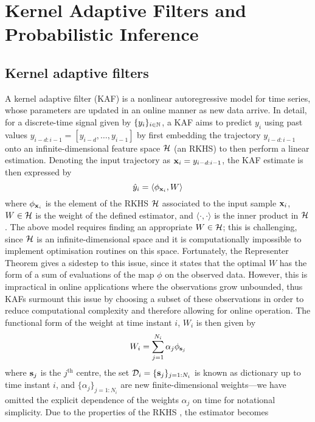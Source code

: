 
\section{Kernel Adaptive Filters and Probabilistic Inference}

\subsection{Kernel adaptive filters}

A kernel adaptive filter (KAF) is a nonlinear autoregressive model for time series, whose parameters are updated in an online manner as new data arrive. In detail, for a discrete-time signal given by $\{y_i\}_{i\in\mathbb{N}}$, a KAF aims to predict $y_i$ using past values $y_{i-d:i-1}=[y_{i-d},\ldots, y_{i-1}]$ by first embedding the trajectory $y_{i-d:i-1}$ onto an infinite-dimensional feature space $\mathcal{H}$ (an RKHS) to then perform a linear estimation. Denoting the input trajectory as $\mathbf{x}_i = y_{i-d:i-1}$, the KAF estimate is then expressed by
\begin{equation}
	\hat{y}_i = \langle {\phi_{\mathbf{x}_i}, W }\rangle
\end{equation}
where $\phi_{\mathbf{x}_i}$ is the element of the RKHS $\mathcal{H}$ associated to the input sample $\mathbf{x}_i$, $W\in\mathcal{H}$ is the weight of the defined estimator, and $\langle{\cdot, \cdot}\rangle$ is the inner product in $\mathcal{H}$.
The above model requires finding an appropriate $W\in\mathcal{H}$; this is challenging, since $\mathcal{H}$ is an infinite-dimensional space and it is computationally impossible to implement optimisation routines on this space. Fortunately, the Representer Theorem \cite{scholkopf01} gives a sidestep to this issue, since it states that the optimal $W$ has the form of a sum of evaluations of the map $\phi$ on the observed data. However, this is impractical in online applications where the observations grow unbounded, thus KAFs surmount this issue by choosing a subset of these observations in order to reduce computational complexity and therefore allowing for online operation. The functional form of the weight at time instant $i$, $W_i$ is then given by 
\begin{equation} 
	W_i = \sum_{j=1} ^{N_i} \alpha_{j}\phi_{\mathbf{s}_j}
	\label{eq:weights}
\end{equation}
where $\mathbf{s}_j$ is the $j^\text{th}$ centre, the set $\mathcal{D}_i = \{\mathbf{s}_j\}_{j=1:N_i}$ is known as dictionary up to time instant $i$, and $\{\alpha_{j}\}_{j=1:N_i}$ are new finite-dimensional weights---we have omitted the explicit dependence of the weights  $\alpha_j$ on time for notational simplicity. Due to the properties of the RKHS \cite{scholkopf01}, the estimator becomes
